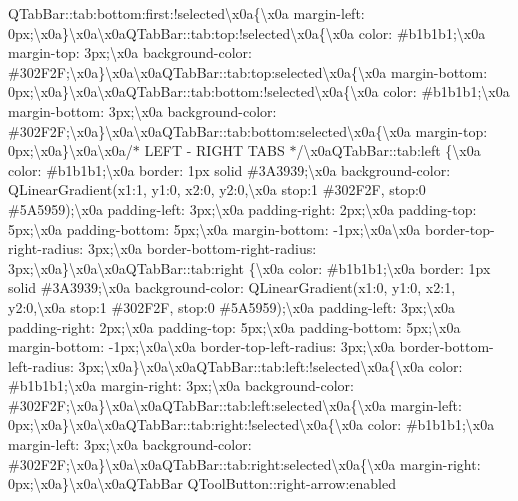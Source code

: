 Q\+Tab\+Bar\+::tab\+:bottom\+:first\+:!selected\textbackslash{}x0a\{\textbackslash{}x0a margin-\/left\+: 0px;\textbackslash{}x0a\}\textbackslash{}x0a\textbackslash{}x0a\+Q\+Tab\+Bar\+::tab\+:top\+:!selected\textbackslash{}x0a\{\textbackslash{}x0a color\+: \#b1b1b1;\textbackslash{}x0a margin-\/top\+: 3px;\textbackslash{}x0a background-\/color\+: \#302\+F2\+F;\textbackslash{}x0a\}\textbackslash{}x0a\textbackslash{}x0a\+Q\+Tab\+Bar\+::tab\+:top\+:selected\textbackslash{}x0a\{\textbackslash{}x0a margin-\/bottom\+: 0px;\textbackslash{}x0a\}\textbackslash{}x0a\textbackslash{}x0a\+Q\+Tab\+Bar\+::tab\+:bottom\+:!selected\textbackslash{}x0a\{\textbackslash{}x0a color\+: \#b1b1b1;\textbackslash{}x0a margin-\/bottom\+: 3px;\textbackslash{}x0a background-\/color\+: \#302\+F2\+F;\textbackslash{}x0a\}\textbackslash{}x0a\textbackslash{}x0a\+Q\+Tab\+Bar\+::tab\+:bottom\+:selected\textbackslash{}x0a\{\textbackslash{}x0a margin-\/top\+: 0px;\textbackslash{}x0a\}\textbackslash{}x0a\textbackslash{}x0a/$\ast$ L\+E\+F\+T -\/ R\+I\+G\+H\+T T\+A\+B\+S $\ast$/\textbackslash{}x0a\+Q\+Tab\+Bar\+::tab\+:left \{\textbackslash{}x0a color\+: \#b1b1b1;\textbackslash{}x0a border\+: 1px solid \#3\+A3939;\textbackslash{}x0a background-\/color\+: Q\+Linear\+Gradient(x1\+:1, y1\+:0, x2\+:0, y2\+:0,\textbackslash{}x0a stop\+:1 \#302\+F2\+F, stop\+:0 \#5\+A5959);\textbackslash{}x0a padding-\/left\+: 3px;\textbackslash{}x0a padding-\/right\+: 2px;\textbackslash{}x0a padding-\/top\+: 5px;\textbackslash{}x0a padding-\/bottom\+: 5px;\textbackslash{}x0a margin-\/bottom\+: -\/1px;\textbackslash{}x0a\textbackslash{}x0a border-\/top-\/right-\/radius\+: 3px;\textbackslash{}x0a border-\/bottom-\/right-\/radius\+: 3px;\textbackslash{}x0a\}\textbackslash{}x0a\textbackslash{}x0a\+Q\+Tab\+Bar\+::tab\+:right \{\textbackslash{}x0a color\+: \#b1b1b1;\textbackslash{}x0a border\+: 1px solid \#3\+A3939;\textbackslash{}x0a background-\/color\+: Q\+Linear\+Gradient(x1\+:0, y1\+:0, x2\+:1, y2\+:0,\textbackslash{}x0a stop\+:1 \#302\+F2\+F, stop\+:0 \#5\+A5959);\textbackslash{}x0a padding-\/left\+: 3px;\textbackslash{}x0a padding-\/right\+: 2px;\textbackslash{}x0a padding-\/top\+: 5px;\textbackslash{}x0a padding-\/bottom\+: 5px;\textbackslash{}x0a margin-\/bottom\+: -\/1px;\textbackslash{}x0a\textbackslash{}x0a border-\/top-\/left-\/radius\+: 3px;\textbackslash{}x0a border-\/bottom-\/left-\/radius\+: 3px;\textbackslash{}x0a\}\textbackslash{}x0a\textbackslash{}x0a\+Q\+Tab\+Bar\+::tab\+:left\+:!selected\textbackslash{}x0a\{\textbackslash{}x0a color\+: \#b1b1b1;\textbackslash{}x0a margin-\/right\+: 3px;\textbackslash{}x0a background-\/color\+: \#302\+F2\+F;\textbackslash{}x0a\}\textbackslash{}x0a\textbackslash{}x0a\+Q\+Tab\+Bar\+::tab\+:left\+:selected\textbackslash{}x0a\{\textbackslash{}x0a margin-\/left\+: 0px;\textbackslash{}x0a\}\textbackslash{}x0a\textbackslash{}x0a\+Q\+Tab\+Bar\+::tab\+:right\+:!selected\textbackslash{}x0a\{\textbackslash{}x0a color\+: \#b1b1b1;\textbackslash{}x0a margin-\/left\+: 3px;\textbackslash{}x0a background-\/color\+: \#302\+F2\+F;\textbackslash{}x0a\}\textbackslash{}x0a\textbackslash{}x0a\+Q\+Tab\+Bar\+::tab\+:right\+:selected\textbackslash{}x0a\{\textbackslash{}x0a margin-\/right\+: 0px;\textbackslash{}x0a\}\textbackslash{}x0a\textbackslash{}x0a\+Q\+Tab\+Bar Q\+Tool\+Button\+::right-\/arrow\+:enabled 